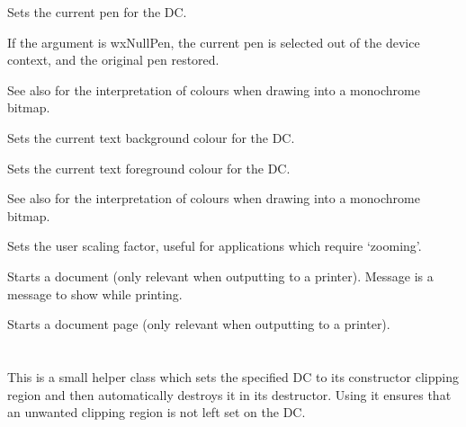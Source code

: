 Sets the current pen for the DC.

If the argument is wxNullPen, the current pen is selected out of the device
context, and the original pen restored.

See also  for the interpretation of colours
when drawing into a monochrome bitmap.


\label{wxdcsettextbackground}


Sets the current text background colour for the DC.


\label{wxdcsettextforeground}


Sets the current text foreground colour for the DC.

See also  for the interpretation of colours
when drawing into a monochrome bitmap.


\label{wxdcsetuserscale}


Sets the user scaling factor, useful for applications which require
`zooming'.


\label{wxdcstartdoc}


Starts a document (only relevant when outputting to a printer).
Message is a message to show while printing.


\label{wxdcstartpage}


Starts a document page (only relevant when outputting to a printer).

\section{}\label{wxdcclipper}

This is a small helper class which sets the specified DC to its constructor
clipping region and then automatically destroys it in its destructor. Using
it ensures that an unwanted clipping region is not left set on the DC.

